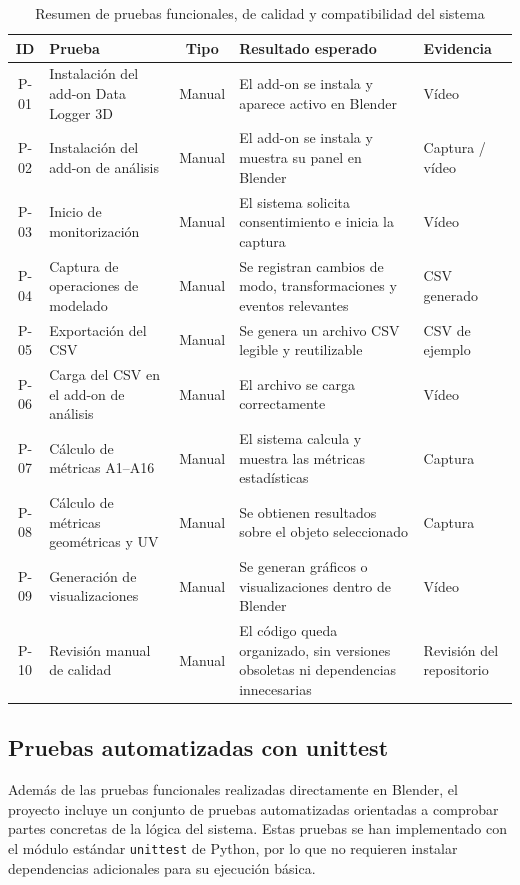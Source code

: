 \begin{table}[H]
\centering
\small
\caption{Resumen de pruebas funcionales, de calidad y compatibilidad del sistema}
\label{tab:pruebas_sistema}
\begin{tabularx}{\textwidth}{|c|X|c|X|X|}
\hline
\textbf{ID} & \textbf{Prueba} & \textbf{Tipo} & \textbf{Resultado esperado} & \textbf{Evidencia} \\
\hline
P-01 & Instalación del add-on Data Logger 3D & Manual & El add-on se instala y aparece activo en Blender & Vídeo \\
\hline
P-02 & Instalación del add-on de análisis & Manual & El add-on se instala y muestra su panel en Blender & Captura / vídeo \\
\hline
P-03 & Inicio de monitorización & Manual & El sistema solicita consentimiento e inicia la captura & Vídeo \\
\hline
P-04 & Captura de operaciones de modelado & Manual & Se registran cambios de modo, transformaciones y eventos relevantes & CSV generado \\
\hline
P-05 & Exportación del CSV & Manual & Se genera un archivo CSV legible y reutilizable & CSV de ejemplo \\
\hline
P-06 & Carga del CSV en el add-on de análisis & Manual & El archivo se carga correctamente & Vídeo \\
\hline
P-07 & Cálculo de métricas A1--A16 & Manual & El sistema calcula y muestra las métricas estadísticas & Captura \\
\hline
P-08 & Cálculo de métricas geométricas y UV & Manual & Se obtienen resultados sobre el objeto seleccionado & Captura \\
\hline
P-09 & Generación de visualizaciones & Manual & Se generan gráficos o visualizaciones dentro de Blender & Vídeo \\
\hline
P-10 & Revisión manual de calidad & Manual & El código queda organizado, sin versiones obsoletas ni dependencias innecesarias & Revisión del repositorio \\
\hline
\end{tabularx}
\end{table}

\subsection{Pruebas automatizadas con unittest}
\label{subsec:d-pruebas-unittest}

Además de las pruebas funcionales realizadas directamente en Blender, el proyecto incluye un conjunto de pruebas automatizadas orientadas a comprobar partes concretas de la lógica del sistema. Estas pruebas se han implementado con el módulo estándar \texttt{unittest} de Python, por lo que no requieren instalar dependencias adicionales para su ejecución básica.

